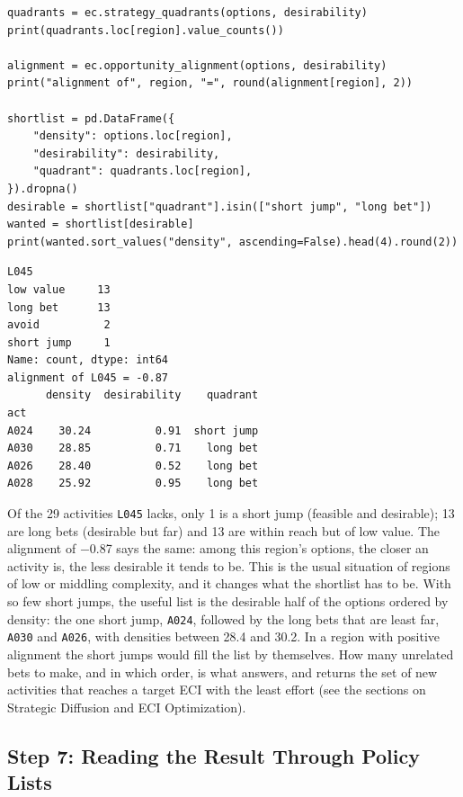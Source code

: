\begin{lstlisting}
quadrants = ec.strategy_quadrants(options, desirability)
print(quadrants.loc[region].value_counts())

alignment = ec.opportunity_alignment(options, desirability)
print("alignment of", region, "=", round(alignment[region], 2))

shortlist = pd.DataFrame({
    "density": options.loc[region],
    "desirability": desirability,
    "quadrant": quadrants.loc[region],
}).dropna()
desirable = shortlist["quadrant"].isin(["short jump", "long bet"])
wanted = shortlist[desirable]
print(wanted.sort_values("density", ascending=False).head(4).round(2))
\end{lstlisting}
\begin{lstlisting}[language={}, numbers=none, backgroundcolor=\color{white}, frame=leftline, framerule=2pt, rulecolor=\color{noteborder}, xleftmargin=1.5em]
L045
low value     13
long bet      13
avoid          2
short jump     1
Name: count, dtype: int64
alignment of L045 = -0.87
      density  desirability    quadrant
act                                    
A024    30.24          0.91  short jump
A030    28.85          0.71    long bet
A026    28.40          0.52    long bet
A028    25.92          0.95    long bet
\end{lstlisting}

Of the 29 activities \texttt{L045} lacks, only
1 is a short jump (feasible and desirable);
13 are long bets
(desirable but far) and
13 are within reach
but of low value. The alignment of $-$0.87 says the same:
among this region's options, the closer an activity is, the less
desirable it tends to be. This is the usual situation of regions of low
or middling complexity, and it changes what the shortlist has to be.
With so few short jumps, the useful list is the desirable half of the
options ordered by density: the one short jump,
\texttt{A024}, followed by the long bets that are least
far, \texttt{A030} and \texttt{A026},
with densities between 28.4 and
30.2. In a region with positive alignment the
short jumps would fill the list by themselves. How many unrelated bets
to make, and in which order, is what  answers,
and  returns the set of new activities that
reaches a target ECI with the least effort (see the sections on
Strategic Diffusion and ECI Optimization).

\subsection{Step 7: Reading the Result Through Policy Lists}

